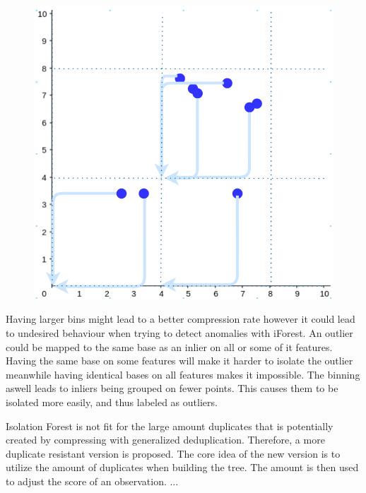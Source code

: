 \begin{figure}
  \centering
  \includegraphics[width=0.5\linewidth]{images/binning-2dev.png}
  \caption{}
  \label{fig:binning}
\end{figure}

Having larger bins might lead to a better compression rate however it could lead to undesired behaviour when trying to detect anomalies with iForest. An outlier could be mapped to the same base as an inlier on all or some of it features. Having the same base on some features will make it harder to isolate the outlier meanwhile having identical bases on all features makes it impossible. The binning aswell leads to inliers being grouped on fewer points. This causes them to be isolated more easily, and thus labeled as outliers.   

Isolation Forest is not fit for the large amount duplicates that is potentially created by compressing with generalized deduplication. Therefore, a more duplicate resistant version is proposed. The core idea of the new version is to utilize the amount of duplicates when building the tree. The amount is then used to adjust the score of an observation. ...        


% 
